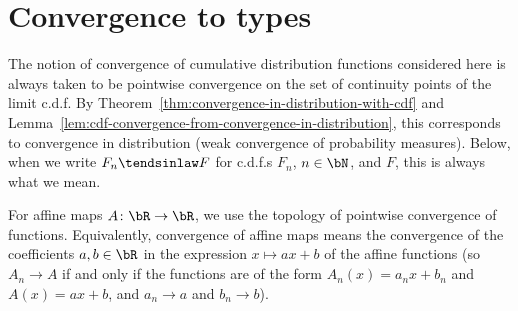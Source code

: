 \section{Convergence to types}

The notion of convergence of cumulative distribution functions
considered here is always taken to be pointwise convergence
on the set of continuity points of the limit c.d.f.
By Theorem~\ref{thm:convergence-in-distribution-with-cdf} and
Lemma~\ref{lem:cdf-convergence-from-convergence-in-distribution},
this corresponds to convergence in distribution (weak convergence
of probability measures). Below, when we write $F_n \tendsinlaw F$
for c.d.f.s $F_n$, $n \in \bN$, and $F$, this is always what we
mean.

For affine maps $A \colon \bR \to \bR$, we use the topology
of pointwise convergence of functions. Equivalently, convergence of affine maps
means the convergence of the coefficients $a, b \in \bR$ in the expression
$x \mapsto a x + b$ of the affine functions
(so $A_n \to A$ if and only if the functions are of the form
$A_n(x) = a_n x + b_n$ and $A(x) = a x + b$, and $a_n \to a$ and $b_n \to b$).

